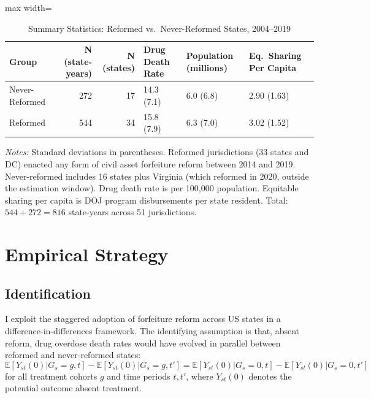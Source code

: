 \documentclass[12pt]{article}
\newcommand{\E}{\mathbb{E}}
\begin{document}
\begin{table}[H]
\centering
\caption{Summary Statistics: Reformed vs.\ Never-Reformed States, 2004--2019}
\label{tab:summary}
\begin{adjustbox}{max width=\textwidth}
\begin{tabular}{lrrlll}
\toprule
Group & N (state-years) & N (states) & Drug Death Rate & Population (millions) & Eq.\ Sharing Per Capita \\
\midrule
Never-Reformed & 272 & 17 & 14.3 (7.1) & 6.0 (6.8) & 2.90 (1.63) \\
Reformed & 544 & 34 & 15.8 (7.9) & 6.3 (7.0) & 3.02 (1.52) \\
\bottomrule
\end{tabular}
\end{adjustbox}
\par\vspace{0.3em}
{\small\textit{Notes:} Standard deviations in parentheses. Reformed jurisdictions (33 states and DC) enacted any form of civil asset forfeiture reform between 2014 and 2019. Never-reformed includes 16 states plus Virginia (which reformed in 2020, outside the estimation window). Drug death rate is per 100,000 population. Equitable sharing per capita is DOJ program disbursements per state resident. Total: $544 + 272 = 816$ state-years across 51 jurisdictions.}
\end{table}


\section{Empirical Strategy}
\label{sec:strategy}

\subsection{Identification}

I exploit the staggered adoption of forfeiture reform across US states in a difference-in-differences framework. The identifying assumption is that, absent reform, drug overdose death rates would have evolved in parallel between reformed and never-reformed states:
\begin{equation}
\E[Y_{st}(0) | G_s = g, t] - \E[Y_{st}(0) | G_s = g, t'] = \E[Y_{st}(0) | G_s = 0, t] - \E[Y_{st}(0) | G_s = 0, t']
\end{equation}
for all treatment cohorts $g$ and time periods $t, t'$, where $Y_{st}(0)$ denotes the potential outcome absent treatment.
\end{document}
